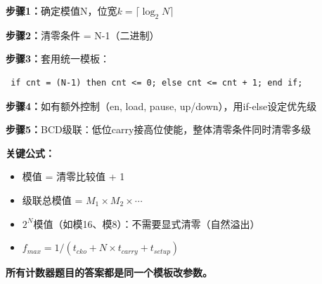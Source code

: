 \begin{quickkill}
\textbf{步骤1：}确定模值N，位宽$k=\lceil\log_2 N\rceil$

\textbf{步骤2：}清零条件 = N-1（二进制）

\textbf{步骤3：}套用统一模板：
\begin{lstlisting}
 if cnt = (N-1) then cnt <= 0; else cnt <= cnt + 1; end if;
\end{lstlisting}

\textbf{步骤4：}如有额外控制（en, load, pause, up/down），用if-else设定优先级

\textbf{步骤5：}BCD级联：低位carry接高位使能，整体清零条件同时清零多级

\textbf{关键公式：}
\begin{itemize}
  \item 模值 = 清零比较值 + 1
  \item 级联总模值 = $M_1 \times M_2 \times \cdots$
  \item $2^N$模值（如模16、模8）：不需要显式清零（自然溢出）
  \item $f_{max} = 1/(t_{cko} + N{\times}t_{carry} + t_{setup})$
\end{itemize}

\textbf{所有计数器题目的答案都是同一个模板改参数。}
\end{quickkill}
